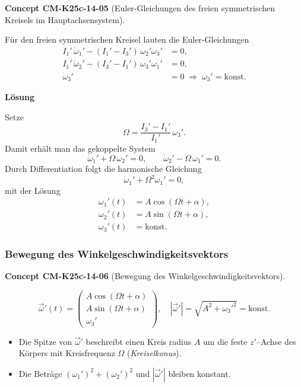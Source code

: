 \documentclass[10pt, letterpaper]{article}
\newcommand{\CustomHeading}[3]{%
  \par\medskip\noindent%
  \textbf{#1 #2} \textnormal{(#3)}.\enskip%
}
\newenvironment{CONC}[2]{\begin{unitbox}\CustomHeading{Concept}{#1}{#2}}{\end{unitbox}}
\begin{document}
\begin{CONC}{CM-K25c-14-05}{Euler‐Gleichungen des freien symmetrischen Kreisels im Hauptachsensystem}
Für den freien symmetrischen Kreisel lauten die Euler‐Gleichungen
\[
\begin{aligned}
I_1'\,\dot\omega_1' - (I_1'-I_3')\,\omega_2'\omega_3' &= 0,\\
I_1'\,\dot\omega_2' - (I_3'-I_1')\,\omega_3'\omega_1' &= 0,\\
\dot\omega_3' &= 0\;\Longrightarrow\; \omega_3'=\text{konst}.
\end{aligned}
\]

\textbf{Lösung}

Setze
\[
\Omega=\frac{I_3'-I_1'}{I_1'}\,\omega_3'.
\]
Damit erhält man das gekoppelte System
\[
\dot\omega_1' + \Omega\,\omega_2' = 0,
\qquad
\dot\omega_2' - \Omega\,\omega_1' = 0.
\]
Durch Differentiation folgt die harmonische Gleichung
\[
\ddot\omega_1' + \Omega^2\omega_1' = 0,
\]
mit der Lösung
\[
\boxed{
\begin{aligned}
\omega_1'(t) &= A\cos(\Omega t+\alpha),\\
\omega_2'(t) &= A\sin(\Omega t+\alpha),\\
\omega_3'(t) &= \text{konst}.
\end{aligned}}
\]
\end{CONC}

\subsubsection*{Bewegung des Winkelgeschwindigkeitsvektors}

\begin{CONC}{CM-K25c-14-06}{Bewegung des Winkelgeschwindigkeitsvektors}
\[
\vec\omega'(t)=
\begin{pmatrix}
A\cos(\Omega t+\alpha)\\
A\sin(\Omega t+\alpha)\\
\omega_3'
\end{pmatrix},
\quad
|\vec\omega'|=\sqrt{A^{2}+{\omega_3'}^{2}}=\text{konst}.
\]

\begin{itemize}
\item Die Spitze von $\vec\omega'$ beschreibt einen Kreis radius $A$ um die feste $z'$–Achse des Körpers mit Kreisfrequenz $\Omega$ (\emph{Kreiselkonus}).  
\item Die Beträge $(\omega_1')^{2}+(\omega_2')^{2}$ und $|\vec\omega'|$ bleiben konstant.
\end{itemize}
\end{CONC}
\end{document}
